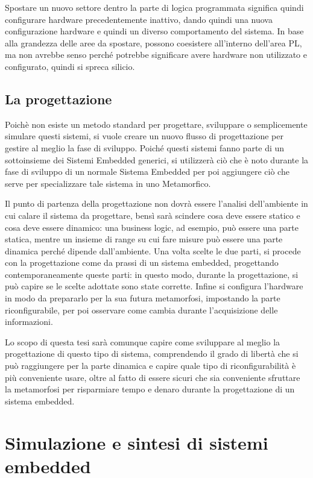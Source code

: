 \documentclass[a4paper,titlepage]{book}
\begin{document}
Spostare un nuovo settore dentro la parte di logica programmata significa quindi configurare hardware precedentemente inattivo, dando quindi una nuova configurazione hardware e quindi un diverso comportamento del sistema. In base alla grandezza delle aree da spostare, possono coesistere all'interno dell'area PL, ma non avrebbe senso perché potrebbe significare avere hardware non utilizzato e configurato, quindi si spreca silicio.

\section{La progettazione}

Poichè non esiste un metodo standard per progettare, sviluppare o semplicemente simulare questi sistemi, si vuole creare un nuovo flusso di progettazione per gestire al meglio la fase di sviluppo. Poiché questi sistemi fanno parte di un sottoinsieme dei Sistemi Embedded generici, si utilizzerà ciò che è noto durante la fase di sviluppo di un normale Sistema Embedded per poi aggiungere ciò che serve per specializzare tale sistema in uno Metamorfico.

Il punto di partenza della progettazione non dovrà essere l'analisi dell'ambiente in cui calare il sistema da progettare, bensì sarà scindere cosa deve essere statico e cosa deve essere dinamico: una business logic, ad esempio, può essere una parte statica, mentre un insieme di range su cui fare misure può essere una parte dinamica perché dipende dall'ambiente. Una volta scelte le due parti, si procede con la progettazione come da prassi di un sistema embedded, progettando contemporaneamente queste parti: in questo modo, durante la progettazione, si può capire se le scelte adottate sono state corrette. Infine si configura l'hardware in modo da prepararlo per la sua futura metamorfosi, impostando la parte riconfigurabile, per poi osservare come cambia durante l'acquisizione delle informazioni.

Lo scopo di questa tesi sarà comunque capire come sviluppare al meglio la progettazione di questo tipo di sistema, comprendendo il grado di libertà che si può raggiungere per la parte dinamica e capire quale tipo di riconfigurabilità è più conveniente usare, oltre al fatto di essere sicuri che sia conveniente sfruttare la metamorfosi per risparmiare tempo e denaro durante la progettazione di un sistema embedded.

\chapter{Simulazione e sintesi di sistemi embedded}
\end{document}
